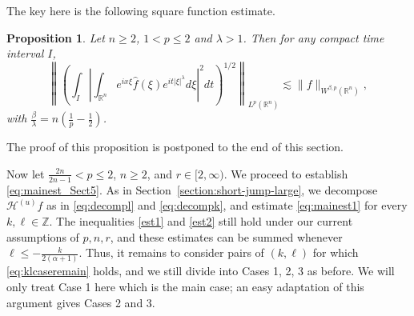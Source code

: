 \documentclass[12pt,leqno]{amsart}
\def\R{\mathbb{R}}
\def\Z{\mathbb{Z}}
\theoremstyle{plain}
\newtheorem{prop}[thm]{Proposition}
\numberwithin{equation}{section}
\begin{document}
The key here is the following square function estimate. 
\begin{prop}\label{170713prop5.1}
Let $n\ge 2$, $1<p\le 2$ and $\lambda>1$. Then for any compact time interval $I$, 
\[
\left\|\left(\int_{I} \left| \int_{\R^n}e^{ix\xi}\hat{f}(\xi)e^{it|\xi|^{\lambda}} d\xi\right|^2 dt\right)^{1/2}\right\|_{L^p(\R^n)} \lesssim \|f\|_{W^{\beta,p}(\R^n)},
\]
with $\frac{\beta}{\lambda}=n(\frac{1}{p}-\frac{1}{2})$.
\end{prop} 
The proof of this proposition is postponed to the end of this section.

Now let $\frac{2n}{2n-1} < p \leq 2$, $n \geq 2$, and $r \in [2, \infty)$. We proceed to establish \eqref{eq:mainest_Sect5}. As in Section~\ref{section:short-jump-large}, we decompose $\mathcal{H}^{(u)} f$ as in \eqref{eq:decompl} and \eqref{eq:decompk}, and estimate \eqref{eq:mainest1} for every $k, \ell \in \Z$. The inequalities \eqref{est1} and \eqref{est2} still hold under our current assumptions of $p, n, r$, and these estimates can be summed whenever $\ell \leq -\frac{k}{2(\alpha + 1)}$. Thus, it remains to consider pairs of $(k,\ell)$ for which \eqref{eq:klcaseremain} holds, and we still divide into Cases 1, 2, 3 as before. We will only treat Case 1 here which is the main case; an easy adaptation of this argument gives Cases 2 and 3.
\end{document}

